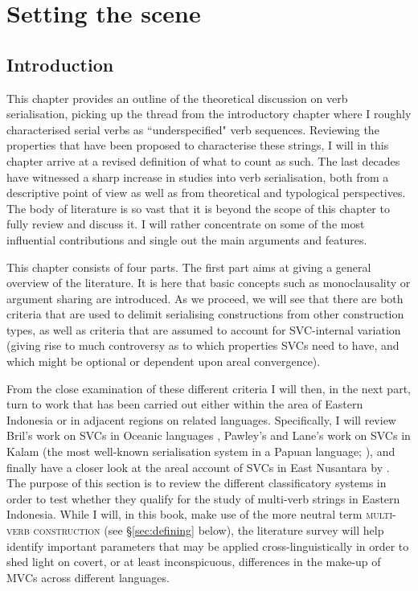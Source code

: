 \chapter{Setting the scene}\label{ch:theory}
\section{Introduction}
This chapter provides an outline of the theoretical discussion on verb serialisation, picking up the thread from the introductory chapter where I roughly characterised serial verbs as ``underspecified" verb sequences. Reviewing the properties that have been proposed to characterise these strings, I will in this chapter arrive at a revised definition of what to count as such. The last decades have witnessed a sharp increase in studies into verb serialisation, both from a descriptive point of view as well as from theoretical and typological perspectives. The body of literature is so vast that it is beyond the scope of this chapter to fully review and discuss it. I will rather concentrate on some of the most influential contributions and single out the main arguments and features.

This chapter consists of four parts. The first part aims at giving a general overview of the literature. It is here that basic concepts such as monoclausality or argument sharing are introduced. As we proceed, we will see that there are both criteria that are used to delimit serialising constructions from other construction types, as well as criteria that are assumed to account for SVC-internal variation (giving rise to much controversy as to which properties SVCs need to have, and which might be optional or dependent upon areal convergence). 

From the close examination of these different criteria I will then, in the next part, turn to work that has been carried out either within the area of Eastern Indonesia or in adjacent regions on related languages. Specifically, I will review Bril's work on SVCs in Oceanic languages \citep{bril2004complex,bril2007nexus}, Pawley's and Lane's work on SVCs in Kalam (the most well-known serialisation system in a Papuan language; \citealt{Pawley1987, pawley2011event, lane2008kalam}), and finally have a closer look at the areal account of SVCs in East Nusantara by \citet{vanstaden2008serial}. The purpose of this section is to review the different classificatory systems in order to test whether they qualify for the study of multi-verb strings in Eastern Indonesia. While I will, in this book, make use of the more neutral term \textsc{multi-verb construction} (see §\ref{sec:defining} below), the literature survey will help identify important parameters that may be applied cross-linguistically in order to shed light on covert, or at least inconspicuous, differences in the make-up of MVCs across different languages.

